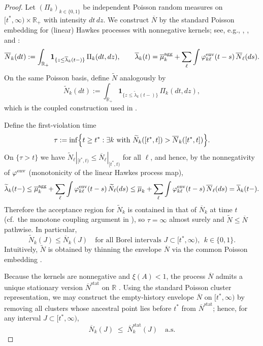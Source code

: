 \documentclass{statsoc}
\newcommand{\bbR}{\mathbb{R}}
\newcommand{\1}{\mathbbm{1}}
\begin{document}
\begin{proof}
Let $(\Pi_k)_{k\in\{0,1\}}$ be independent Poisson random measures on $[t^\ast,\infty)\times\mathbb{R}_+$ with intensity $dt\,dz$. We construct $\overline N$ by the standard Poisson embedding for (linear) Hawkes processes with nonnegative kernels; see, e.g., \cite[Proposition~14.7.I]{daley2007introduction}, \citet[Section~3]{bremaud1996stability}, and \citet{bremaud2002rate}:
\[
  \overline N_k(dt)
  :=\int_{\mathbb{R}_+}\mathbf 1_{\{z\le \overline\lambda_k(t-)\}}\,
  \Pi_k(dt,dz),
  \qquad
  \overline\lambda_k(t)
  =\overline\mu_k^{\rm agg}+\sum_\ell\int \varphi^{\rm env}_{k\ell}(t-s)\,\overline N_\ell(ds).
\]
On the same Poisson basis, define $\widetilde N$ analogously by
\[
  \widetilde N_k(dt)
  :=\int_{\mathbb{R}_+}\mathbf 1_{\{z\le \widetilde\lambda_k(t-)\}}\,
  \Pi_k(dt,dz),
\]
which is the coupled construction used in \cite[Lemma~3]{bremaud1996stability}.

Define the first-violation time
\[
  \tau:=\inf\Bigl\{t\ge t^\ast:\exists k \text{ with }\widetilde N_k([t^\ast,t])>\overline N_k([t^\ast,t])\Bigr\}.
\]
On $\{\tau>t\}$ we have $\widetilde N_\ell|_{[t^\ast,t)}\le \overline N_\ell|_{[t^\ast,t)}$ for all $\ell$, and hence, by the nonnegativity of $\varphi^{\rm env}$ (monotonicity of the linear Hawkes  process map),
\[
  \widetilde\lambda_k(t-)
  \le \overline\mu_k^{\rm agg}+\sum_\ell \int \varphi^{\rm env}_{k\ell}(t-s)\,\widetilde N_\ell(ds)
  \le \overline\mu_k+\sum_\ell\int \varphi^{\rm env}_{k\ell}(t-s)\,\overline N_\ell(ds)
  =\overline\lambda_k(t-).
\]
Therefore the acceptance region for $\widetilde N_k$ is contained in that of $\overline N_k$ at time $t$ (cf.\ the monotone coupling argument in \citet{bremaud1996stability}), so $\tau=\infty$ almost surely and $\widetilde N\le \overline N$ pathwise. In particular,
\begin{equation}\label{eq:env-domination-app}
  \widetilde N_k(J)\le \overline N_k(J)
  \quad\text{for all Borel intervals }J\subset[t^\ast,\infty),\ \ k\in\{0,1\}.
\end{equation}
Intuitively, $\widetilde N$ is obtained by thinning the envelope $\overline N$ via the common Poisson embedding \cite[Proposition~14.7.I]{daley2007introduction}.


Because the kernels are nonnegative and $\xi(A)<1$, the process $\overline N$ admits a unique stationary version $\overline N^{\mathrm{stat}}$ on $\bbR$ \citep{bremaud1996stability}. Using the standard Poisson cluster representation, we may construct the empty-history envelope $\overline N$ on $[t^\ast,\infty)$ by removing all clusters whose ancestral point lies before $t^\ast$ from $\overline N^{\mathrm{stat}}$; hence, for any interval $J\subset[t^\ast,\infty)$,
\begin{equation}\label{eq:stationary-domination-app}
  \overline N_k(J) \;\le\; \overline N^{\mathrm{stat}}_k(J)
  \quad\text{a.s.}
\end{equation}


\end{proof}
\end{document}
